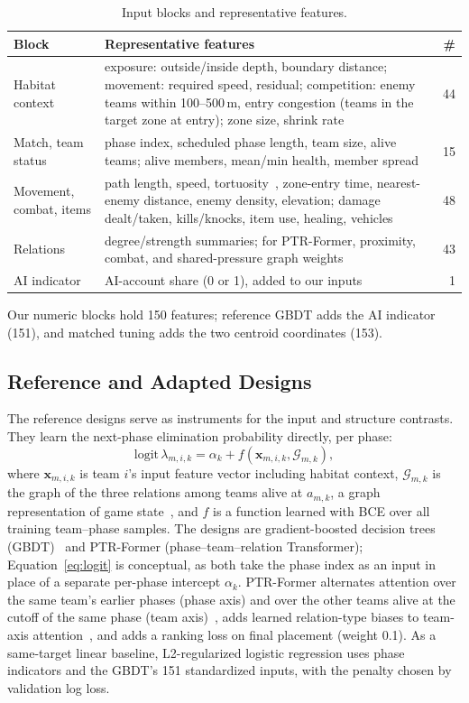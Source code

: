 \documentclass[sigconf,anonymous]{acmart}
\begin{document}
\begin{table}[t]
\centering
\caption{Input blocks and representative features.}
\label{tab:blocks}
\scriptsize
\setlength{\tabcolsep}{3pt}
\begin{tabular}{>{\raggedright\arraybackslash}p{1.45cm}p{5.8cm}r}
\hline
Block & Representative features & \# \\
\hline
Habitat context & exposure: outside/inside depth, boundary distance; movement: required speed, residual; competition: enemy teams within 100--500\,m, entry congestion (teams in the target zone at entry); zone size, shrink rate & 44 \\
Match, team status & phase index, scheduled phase length, team size, alive teams; alive members, mean/min health, member spread & 15 \\
Movement, combat, items & path length, speed, tortuosity~\cite{Zheng15}, zone-entry time, nearest-enemy distance, enemy density, elevation; damage dealt/taken, kills/knocks, item use, healing, vehicles & 48 \\
Relations & degree/strength summaries; for PTR-Former, proximity, combat, and shared-pressure graph weights & 43 \\
AI indicator & AI-account share (0 or 1), added to our inputs & 1 \\
\hline
\end{tabular}
\smallskip
\parbox{\columnwidth}{\scriptsize Our numeric blocks hold 150 features; reference GBDT adds the AI indicator (151), and matched tuning adds the two centroid coordinates (153).}
\end{table}

\subsection{Reference and Adapted Designs}
\label{sec:method:rq2}
The reference designs serve as instruments for the input and structure contrasts. They learn the next-phase elimination probability directly, per phase:
\begin{equation}
\mathrm{logit}\,\lambda_{m,i,k}=\alpha_k+f(\mathbf{x}_{m,i,k},\mathcal{G}_{m,k}),
\label{eq:logit}
\end{equation}
where $\mathbf{x}_{m,i,k}$ is team $i$'s input feature vector including habitat context, $\mathcal{G}_{m,k}$ is the graph of the three relations among teams alive at $a_{m,k}$, a graph representation of game state~\cite{Xenopoulos21}, and $f$ is a function learned with BCE over all training team--phase samples. The designs are gradient-boosted decision trees (GBDT)~\cite{Friedman01} and PTR-Former (phase--team--relation Transformer); Equation~\eqref{eq:logit} is conceptual, as both take the phase index as an input in place of a separate per-phase intercept $\alpha_k$. PTR-Former alternates attention over the same team's earlier phases (phase axis) and over the other teams alive at the cutoff of the same phase (team axis)~\cite{Vaswani17,Ngiam22}, adds learned relation-type biases to team-axis attention~\cite{Ying21}, and adds a ranking loss on final placement (weight 0.1). As a same-target linear baseline, L2-regularized logistic regression uses phase indicators and the GBDT's 151 standardized inputs, with the penalty chosen by validation log loss.
\end{document}
